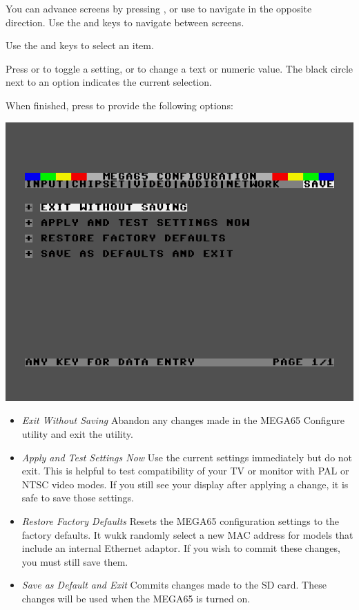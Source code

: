 You can advance screens by pressing , or use  to navigate in the opposite direction. Use the \megakey{$\leftarrow$} and \megakey{$\rightarrow$} keys to navigate between screens.

Use the \megakey{$\uparrow$} and \megakey{$\downarrow$} keys to select an item.

Press  or  to toggle a setting, or to change a text or numeric value. The black circle next to an option indicates the current selection.

When finished, press  to provide the following options:

\includegraphics[width=\linewidth]{images/ss-m65config-save.png}

\begin{itemize}
  \item{\em Exit Without Saving} Abandon any changes made in the MEGA65 Configure utility and exit the utility.
  \item{\em Apply and Test Settings Now} Use the current settings immediately but do not exit. This is helpful to test compatibility of your TV or monitor with PAL or NTSC video modes. If you still see your display after applying a change, it is safe to save those settings.
  \item{\em Restore Factory Defaults} Resets the MEGA65 configuration settings to the factory defaults. It wukk randomly select a new MAC address for models that include an internal Ethernet adaptor. If you wish to commit these changes, you must still save them.
  \item{\em Save as Default and Exit} Commits changes made to the SD card. These changes will be used when the MEGA65 is turned on.
\end{itemize}

